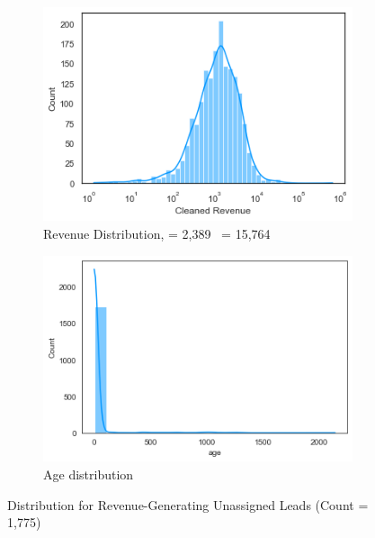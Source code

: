 \documentclass[11pt]{article}
\begin{document}
\begin{figure}[h!]
    \centering
    \begin{subfigure}[l]{0.45\textwidth}
         \centering
        \includegraphics[scale=.5]{Images/Unassigned_Revenue_Histogram.png}
         \caption{Revenue Distribution, \mu = 2,389 \ \sigma = 15,764}
         \label{fig:revenue distribution}
     \end{subfigure}
       \begin{subfigure}[r]{0.4\textwidth}
         \centering
       \includegraphics[scale=.5]{Images/unassigned_date_created_histogram.png}
         \caption{Age distribution  \ }
         \label{fig:date distriburtion}
     \end{subfigure}
    \caption{Distribution for Revenue-Generating Unassigned Leads (Count = 1,775)}
    \label{fig:assigned_lead_rev}
\end{figure}


\begin{table}[h]
    \centering
    \caption{Descriptive Statistics for Revenue-Generating Leads}
    \label{tab:my_label}
\end{table}         
\end{document}
